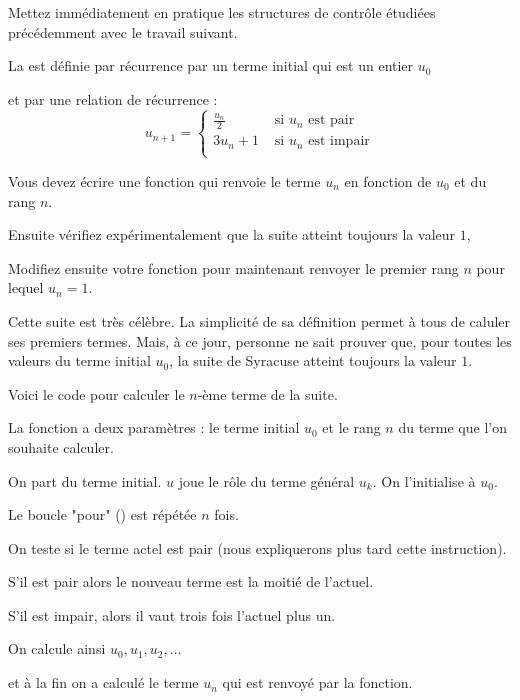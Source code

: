 \diapo

Mettez immédiatement en pratique les structures de contrôle étudiées précédemment 
avec le travail suivant.

La   est  définie par récurrence
par un terme initial qui est un entier $u_0$

et par une relation de récurrence :
$$u_{n+1} = 
\begin{cases}
  \frac{u_n}{2} & \text{ si $u_n$ est pair} \\
  3u_n + 1 & \text{ si $u_n$ est impair} \\
  \end{cases}$$
  
  Vous devez écrire une fonction qui renvoie le terme $u_n$ 
  en fonction de $u_0$ et du rang $n$.
  
  Ensuite vérifiez expérimentalement
  que la suite atteint toujours la valeur $1$, 
  
  Modifiez ensuite votre fonction pour maintenant 
  renvoyer le premier rang $n$ pour lequel $u_n = 1$.
  

Cette suite est très célèbre. La simplicité de sa définition permet à tous de caluler ses premiers termes.
Mais, à ce jour, personne ne sait prouver que, pour toutes les valeurs 
du terme initial $u_0$, la suite de Syracuse atteint toujours la valeur $1$.


\diapo

Voici le code pour calculer le $n$-ème terme de la suite.

La fonction a deux paramètres : le terme initial $u_0$ et le rang $n$
du terme que l'on souhaite calculer.


On part du terme initial. 
$u$ joue le rôle du terme général $u_k$.
On l'initialise à $u_0$.


Le boucle "pour" () est répétée $n$ fois.

On teste si le terme actel est pair (nous expliquerons plus tard cette instruction).

S'il est pair alors le nouveau terme est la moitié de l'actuel.

S'il est impair, alors il vaut trois fois l'actuel plus un.%

On calcule ainsi $u_0, u_1, u_2,...$

et à la fin on a calculé le terme $u_n$ qui est renvoyé par la fonction. 

